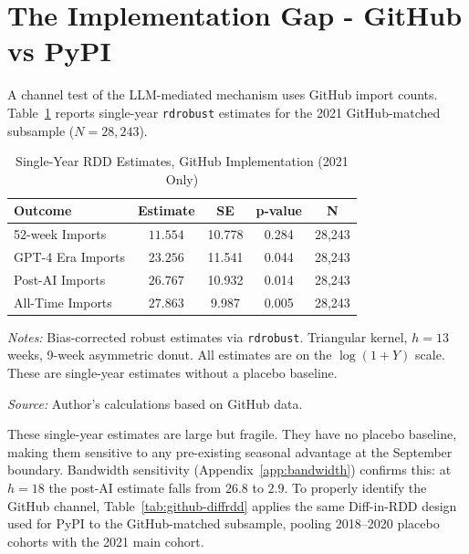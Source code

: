 \documentclass[12pt, a4paper]{report}
\begin{document}
\section{The Implementation Gap - GitHub vs PyPI}\label{sec:results-github}
A channel test of the LLM-mediated mechanism uses GitHub import counts. Table~\ref{tab:github-rdd} reports single-year \texttt{rdrobust} estimates for the 2021 GitHub-matched subsample ($N = 28{,}243$).

\begin{table}[ht]
\centering
\caption{Single-Year RDD Estimates, GitHub Implementation (2021 Only)}\label{tab:github-rdd}
\small
\begin{tabular}{lcccc}
\toprule
\textbf{Outcome} & \textbf{Estimate} & \textbf{SE} & \textbf{p-value} & \textbf{N} \\ \midrule
52-week Imports & $11.554$ & 10.778 & 0.284 & 28,243 \\
GPT-4 Era Imports & $23.256$ & 11.541 & 0.044 & 28,243 \\
Post-AI Imports & $26.767$ & 10.932 & 0.014 & 28,243 \\
All-Time Imports & $27.863$ & 9.987 & 0.005 & 28,243 \\ \bottomrule
\end{tabular}
\begin{tablenotes}
\small
\item \textit{Notes:} Bias-corrected robust estimates via \texttt{rdrobust}. Triangular kernel, $h = 13$ weeks, 9-week asymmetric donut. All estimates are on the $\log(1+Y)$ scale. These are single-year estimates without a placebo baseline.
\item \textit{Source:} Author's calculations based on GitHub data.
\end{tablenotes}
\end{table}

These single-year estimates are large but fragile. They have no placebo baseline, making them sensitive to any pre-existing seasonal advantage at the September boundary. Bandwidth sensitivity (Appendix~\ref{app:bandwidth}) confirms this: at $h = 18$ the post-AI estimate falls from $26.8$ to $2.9$. To properly identify the GitHub channel, Table~\ref{tab:github-diffrdd} applies the same Diff-in-RDD design used for PyPI to the GitHub-matched subsample, pooling 2018--2020 placebo cohorts with the 2021 main cohort.
\end{document}
